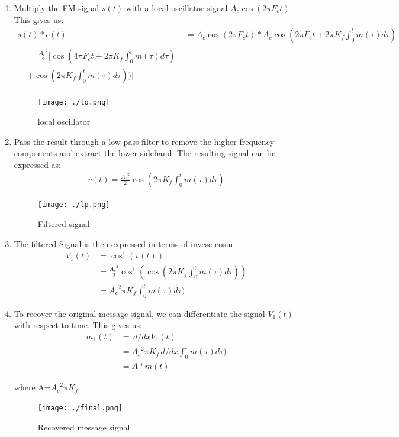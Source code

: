 \documentclass[journal,5pt,twocolumn]{IEEEtran}
\begin{document}
\begin{enumerate}
 \item    Multiply the FM signal $s(t)$ with a local oscillator signal $A_c\cos(2\pi F_ct)$. This gives us:
 \begin{align}   
    s(t)*c(t)& = A_c \cos(2 \pi F_c t )*  A_c \cos (2 \pi F_c t +2\pi K_{f} \int_{0}^t m(\tau) d\tau) \\
    \begin{split}
    &=\frac{{A_c}^2}{2}[\cos (4 \pi F_c t +2\pi K_{f} \int_{0}^t m(\tau) d\tau)\\ & + \cos (2\pi K_{f} \int_{0}^t m(\tau) d\tau))]  
    \end{split}
    \end{align}
    
    \begin{figure}
\centering 
\texttt{[image: ./lo.png]}
\caption{local oscillator}
\label{fig:lo}
\end{figure}

\item    Pass the result through a low-pass filter to remove the higher frequency components and extract the lower sideband. The resulting signal can be expressed as:
    \begin{align*}
     v(t)=\frac{{A_c}^2}{2}\cos (2\pi K_{f} \int_{0}^t m(\tau) d\tau)
    \end{align*}
    \begin{figure}
\centering 
\texttt{[image: ./lp.png]}
\caption{Filtered signal}
\label{fig:LPF}
\end{figure}
\item  The filtered Signal is then expressed in terms of invese cosin
  \begin{align*}
  {V_1}(t)&=\cos^1(v(t))\\
  &=\frac{{A_c}^2}{2}\cos^1(\cos (2\pi K_{f} \int_{0}^t m(\tau) d\tau))\\
  &={A_c}^2\pi K_{f} \int_{0}^t m(\tau) d\tau)
  \end{align*}


 \item   To recover the original message signal, we can differentiate the signal $V_1(t)$ with respect to time. This gives us:
\begin{align}
m_1(t)&= \,d/dxV_1(t)\\
&={A_c}^2\pi K_{f} \,d/dx \int_{0}^t m(\tau) d\tau)\\
&=A * m(t)
\end{align}

where A=${A_c}^2\pi K_{f}$

\begin{figure}
\centering 
\texttt{[image: ./final.png]}
\caption{Recovered message signal}
\label{fig:final}
\end{figure}
\end{enumerate}
\end{document}
